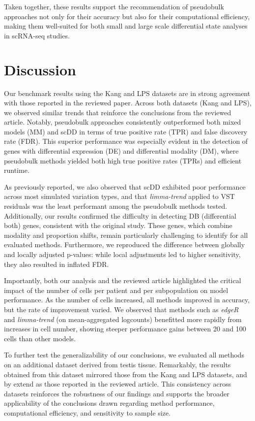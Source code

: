 \documentclass[a4paper, 11pt, twocolumn]{article}
\begin{document}
\begin{multicols}{2}
Taken together, these results support the recommendation of pseudobulk approaches not only for their accuracy but also for their computational efficiency, making them well-suited for both small and large scale differential state analyses in scRNA-seq studies.

\section{Discussion}

Our benchmark results using the Kang and LPS datasets are in strong agreement with those reported in the reviewed paper. Across both datasets (Kang and LPS), we observed similar trends that reinforce the conclusions from the reviewed article. Notably, pseudobulk approaches consistently outperformed both mixed models (MM) and scDD in terms of true positive rate (TPR) and false discovery rate (FDR). This superior performance was especially evident in the detection of genes with differential expression (DE) and differential modality (DM), where pseudobulk methods yielded both high true positive rates (TPRs) and efficient runtime.

As previously reported, we also observed that scDD exhibited poor performance across most simulated variation types, and that \textit{limma-trend} applied to VST residuals was the least performant among the pseudobulk methods tested. Additionally, our results confirmed the difficulty in detecting DB (differential both) genes, consistent with the original study. These genes, which combine modality and proportion shifts, remain particularly challenging to identify for all evaluated methods. Furthermore, we reproduced the difference between globally and locally adjusted p-values: while local adjustments led to higher sensitivity, they also resulted in inflated FDR.

Importantly, both our analysis and the reviewed article highlighted the critical impact of the number of cells per patient and per subpopulation on model performance. As the number of cells increased, all methods improved in accuracy, but the rate of improvement varied. We observed that methods such as \textit{edgeR} and \textit{limma-trend} (on mean-aggregated logcounts) benefitted more rapidly from increases in cell number, showing steeper performance gains between 20 and 100 cells than other models.

To further test the generalizability of our conclusions, we evaluated all methods on an additional dataset derived from testis tissue. Remarkably, the results obtained from this dataset mirrored those from the Kang and LPS datasets, and by extend as those reported in the reviewed article. This consistency across datasets reinforces the robustness of our findings and supports the broader applicability of the conclusions drawn regarding method performance, computational efficiency, and sensitivity to sample size.


\end{multicols}
\end{document}
